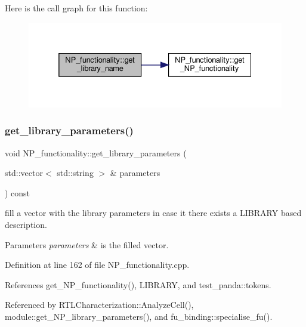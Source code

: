 Here is the call graph for this function\+:
\nopagebreak
\begin{figure}[H]
\begin{center}
\leavevmode
\includegraphics[width=332pt]{d8/dda/classNP__functionality_aa7c45178985092a5830506c425c42b63_cgraph}
\end{center}
\end{figure}
\mbox{\label{classNP__functionality_ae6f15608e45bcf504170ceada6e36d72}} 
\subsubsection{\texorpdfstring{get\+\_\+library\+\_\+parameters()}{get\_library\_parameters()}}
{\footnotesize\ttfamily void N\+P\+\_\+functionality\+::get\+\_\+library\+\_\+parameters (\begin{DoxyParamCaption}\item[{std\+::vector$<$ std\+::string $>$ \&}]{parameters }\end{DoxyParamCaption}) const}



fill a vector with the library parameters in case it there exists a L\+I\+B\+R\+A\+RY based description. 


\begin{DoxyParams}{Parameters}
{\em parameters} & is the filled vector. \\
\hline
\end{DoxyParams}


Definition at line 162 of file N\+P\+\_\+functionality.\+cpp.



References get\+\_\+\+N\+P\+\_\+functionality(), L\+I\+B\+R\+A\+RY, and test\+\_\+panda\+::tokens.



Referenced by R\+T\+L\+Characterization\+::\+Analyze\+Cell(), module\+::get\+\_\+\+N\+P\+\_\+library\+\_\+parameters(), and fu\+\_\+binding\+::specialise\+\_\+fu().

